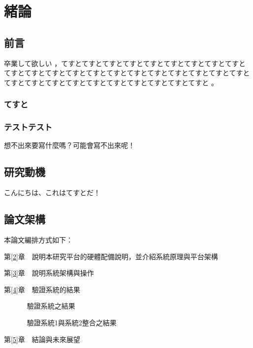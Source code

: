 
\chapter{緒論}\label{1}


\section{前言}\label{1-1}
卒業して欲しい \cite{m1} ，てすとてすとてすとてすとてすとてすとてすとてすとてすとてすとてすとてすとてすとてすとてすとてすとてすとてすとてすとてすとてすとてすとてすとてすとてすとてすとてすとてすとてすとてすとてすと\cite{talbot97} 。

\subsection{てすと}


\subsection{テストテスト}
想不出來要寫什麼嗎？可能會寫不出來呢！\cite{goossens97}

\newpage

\section{研究動機}\label{1-2}
こんにちは、これはてすとだ！

\newpage

\section{論文架構}\label{1-3}

\n 本論文編排方式如下：

第\ref{2}章　說明本研究平台的硬體配備說明，並介紹系統原理與平台架構

第\ref{3}章　說明系統架構與操作

第\ref{4}章　驗證系統的結果
		
　　　      驗證系統之結果

　　　      驗證系統1與系統2整合之結果

第\ref{5}章　結論與未來展望
